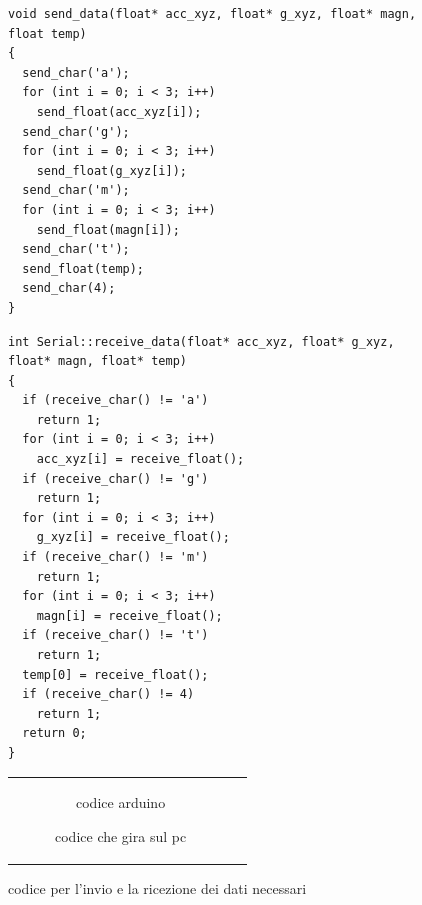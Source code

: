 \documentclass[10pt,a4paper]{article}
\begin{document}
\newsavebox{\mylistingboxcodeard}
\newsavebox{\mylistingboxcodepc}
\begin{figure}[h!]
	\centering
	\begin{lrbox}{\mylistingboxcodeard}%
		\begin{minipage}{.40\linewidth}%
			\centering
			\begin{lstlisting}[style=mycpp]
void send_data(float* acc_xyz, float* g_xyz, float* magn, float temp)
{
  send_char('a');
  for (int i = 0; i < 3; i++)
    send_float(acc_xyz[i]);
  send_char('g');
  for (int i = 0; i < 3; i++)
    send_float(g_xyz[i]);
  send_char('m');
  for (int i = 0; i < 3; i++)
    send_float(magn[i]);
  send_char('t');
  send_float(temp);
  send_char(4);
}
			\end{lstlisting}%
		\end{minipage}%
	\end{lrbox}%
	
	
	\begin{lrbox}{\mylistingboxcodepc}%
		\begin{minipage}{.40\linewidth}%
			\centering
			\begin{lstlisting}[style=mycpp]
int Serial::receive_data(float* acc_xyz, float* g_xyz, float* magn, float* temp)
{
  if (receive_char() != 'a')
    return 1;
  for (int i = 0; i < 3; i++)
    acc_xyz[i] = receive_float();
  if (receive_char() != 'g')
    return 1;
  for (int i = 0; i < 3; i++)
    g_xyz[i] = receive_float();
  if (receive_char() != 'm')
    return 1;
  for (int i = 0; i < 3; i++)
    magn[i] = receive_float();
  if (receive_char() != 't')
    return 1;
  temp[0] = receive_float();
  if (receive_char() != 4)
    return 1;
  return 0;
}
			\end{lstlisting}%
		\end{minipage}%
	\end{lrbox}%
	
	
	\begin{tabular}{@{}cc@{}}
		
		
		\begin{subfigure}[b]{.40\textwidth}
			\centering
			\usebox{\mylistingboxcodeard}
			\vspace{-10pt}
			\caption{codice arduino}
  			\label{fig:codeard}
 		\end{subfigure} 
	 	
	 	\hspace{40pt}
		
		\begin{subfigure}[b]{.40\textwidth}
			\centering
			\usebox{\mylistingboxcodepc}
			\vspace{-10pt}
			\caption{codice che gira sul pc}
  			\label{fig:codepc}
 		\end{subfigure} 
		
	\end{tabular}
	
	\caption{codice per l'invio e la ricezione dei dati necessari}
	\label{fig:send_receive_float}
\end{figure}
\end{document}
